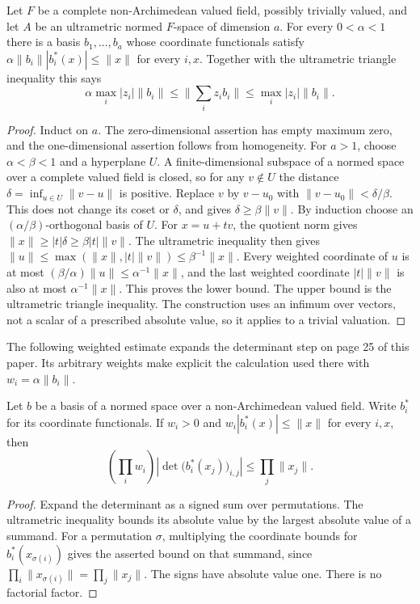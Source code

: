 \begin{lemma}
\label{lem:contraction-nearly-orthogonal-basis}
\leanok
Let $F$ be a complete non-Archimedean valued field, possibly trivially valued,
and let $A$ be an ultrametric normed $F$-space of dimension $a$. For every
$0<\alpha<1$ there is a basis $b_1,\ldots,b_a$ whose coordinate functionals
satisfy $\alpha\|b_i\||b_i^*(x)|\leq\|x\|$ for every $i,x$.
Together with the ultrametric triangle inequality this says
\[
 \alpha\max_i |z_i|\|b_i\|
 \leq\Big\|\sum_i z_i b_i\Big\|
 \leq\max_i |z_i|\|b_i\|.
\]
\end{lemma}
\begin{proof}
Induct on $a$. The zero-dimensional assertion has empty maximum zero, and
the one-dimensional assertion follows from homogeneity. For $a>1$, choose
$\alpha<\beta<1$ and a hyperplane $U$. A finite-dimensional subspace of a
normed space over a complete valued field is closed, so for any $v\notin U$
the distance $\delta=\inf_{u\in U}\|v-u\|$ is positive. Replace $v$ by
$v-u_0$ with $\|v-u_0\|<\delta/\beta$. This does not change its coset or
$\delta$, and gives $\delta\geq\beta\|v\|$.
By induction choose an $(\alpha/\beta)$-orthogonal basis of $U$.
For $x=u+tv$, the quotient norm gives
$\|x\|\geq |t|\delta\geq\beta|t|\|v\|$. The ultrametric inequality
then gives $\|u\|\leq\max(\|x\|,|t|\|v\|)\leq\beta^{-1}\|x\|$.
Every weighted coordinate of $u$ is at most
$(\beta/\alpha)\|u\|\leq\alpha^{-1}\|x\|$, and the last weighted
coordinate $|t|\|v\|$ is also at most $\alpha^{-1}\|x\|$.
This proves the lower bound. The upper bound is the ultrametric triangle
inequality. The construction uses an infimum over vectors, not a scalar
of a prescribed absolute value, so it applies to a trivial valuation.
\end{proof}

The following weighted estimate expands the determinant step on page 25 of
this paper. Its arbitrary weights make explicit the calculation used there
with $w_i=\alpha\|b_i\|$.

\begin{lemma}
\label{lem:contraction-weighted-determinant}
\leanok
Let $b$ be a basis of a normed space over a non-Archimedean valued field.
Write $b_i^*$ for its coordinate functionals. If $w_i>0$ and
$w_i|b_i^*(x)|\leq\|x\|$ for every $i,x$, then
\[
 \left(\prod_i w_i\right)
 \left|\det\bigl(b_i^*(x_j)\bigr)_{i,j}\right|
 \leq\prod_j\|x_j\|.
\]
\end{lemma}
\begin{proof}
Expand the determinant as a signed sum over permutations. The ultrametric
inequality bounds its absolute value by the largest absolute value of a
summand. For a permutation $\sigma$, multiplying the coordinate bounds for
$b_i^*(x_{\sigma(i)})$ gives the asserted bound on that summand, since
$\prod_i\|x_{\sigma(i)}\|=\prod_j\|x_j\|$.
The signs have absolute value one. There is no factorial factor.
\end{proof}

